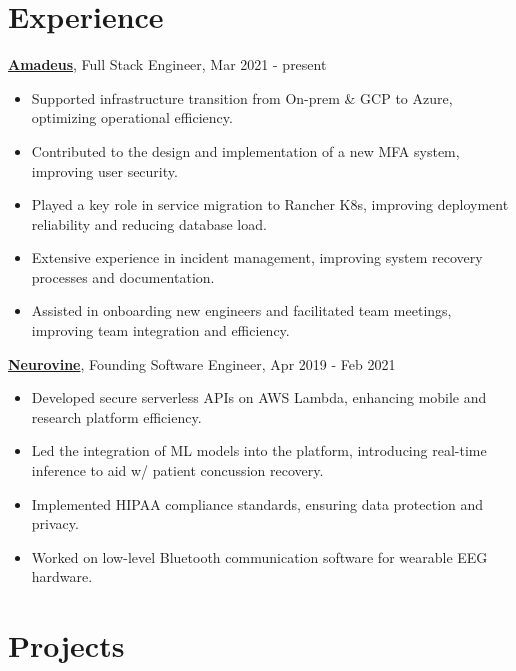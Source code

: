 \section*{Experience}

\noindent
\textbf{\href{https://amadeus.com/en}{Amadeus}}, Full Stack Engineer, Mar 2021 - present
\begin{itemize}
    \setlength\itemsep{0em}
    \item Supported infrastructure transition from On-prem \& GCP to Azure, optimizing operational efficiency.
    \item Contributed to the design and implementation of a new MFA system, improving user security.
    \item Played a key role in service migration to Rancher K8s, improving deployment reliability and reducing database load.
    \item Extensive experience in incident management, improving system recovery processes and documentation.
    \item Assisted in onboarding new engineers and facilitated team meetings, improving team integration and efficiency.
\end{itemize}

\noindent
\textbf{\href{https://neurovine.ai}{Neurovine}}, Founding Software Engineer, Apr 2019 - Feb 2021
\begin{itemize}
    \setlength\itemsep{0em}
    \item Developed secure serverless APIs on AWS Lambda, enhancing mobile and research platform efficiency.
    \item Led the integration of ML models into the platform, introducing real-time inference to aid w/ patient concussion recovery.
    \item Implemented HIPAA compliance standards, ensuring data protection and privacy.
    \item Worked on low-level Bluetooth communication software for wearable EEG hardware.
\end{itemize}

\section*{Projects}

